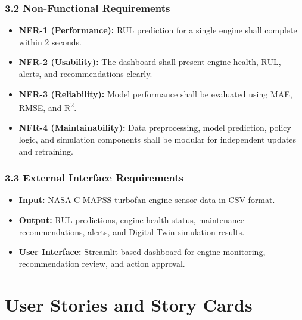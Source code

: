 \documentclass[12pt,a4paper]{report}
\begin{document}
\subsubsection*{3.2 Non-Functional Requirements}
\begin{itemize}
    \item \textbf{NFR-1 (Performance):} RUL prediction for a single engine shall complete within 2 seconds.
    \item \textbf{NFR-2 (Usability):} The dashboard shall present engine health, RUL, alerts, and recommendations clearly.
    \item \textbf{NFR-3 (Reliability):} Model performance shall be evaluated using MAE, RMSE, and R\textsuperscript{2}.
    \item \textbf{NFR-4 (Maintainability):} Data preprocessing, model prediction, policy logic, and simulation components shall be modular for independent updates and retraining.
\end{itemize}

\subsubsection*{3.3 External Interface Requirements}
\begin{itemize}
    \item \textbf{Input:} NASA C-MAPSS turbofan engine sensor data in CSV format.
    \item \textbf{Output:} RUL predictions, engine health status, maintenance recommendations, alerts, and Digital Twin simulation results.
    \item \textbf{User Interface:} Streamlit-based dashboard for engine monitoring, recommendation review, and action approval.
\end{itemize}

\newpage

\section{User Stories and Story Cards}
\end{document}
